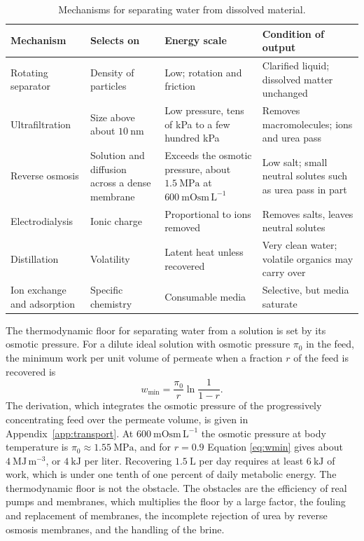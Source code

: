 \documentclass[11pt,openany]{book}
\theoremstyle{definition}
\theoremstyle{remark}
\begin{document}
\begin{table}[ht]
\centering
\caption{Mechanisms for separating water from dissolved material.}
\label{tab:sep}
\small
\begin{tabular}{@{}p{2.6cm}p{3.1cm}p{3.6cm}p{4.3cm}@{}}
\toprule
Mechanism & Selects on & Energy scale & Condition of output \\
\midrule
Rotating separator & Density of particles & Low; rotation and friction & Clarified liquid; dissolved matter unchanged \\
Ultrafiltration & Size above about $10\ \mathrm{nm}$ & Low pressure, tens of kPa to a few hundred kPa & Removes macromolecules; ions and urea pass \\
Reverse osmosis & Solution and diffusion across a dense membrane & Exceeds the osmotic pressure, about $1.5\ \mathrm{MPa}$ at $600\ \mathrm{mOsm\,L^{-1}}$ & Low salt; small neutral solutes such as urea pass in part \\
Electrodialysis & Ionic charge & Proportional to ions removed & Removes salts, leaves neutral solutes \\
Distillation & Volatility & Latent heat unless recovered & Very clean water; volatile organics may carry over \\
Ion exchange and adsorption & Specific chemistry & Consumable media & Selective, but media saturate \\
\bottomrule
\end{tabular}
\end{table}

The thermodynamic floor for separating water from a solution is set by its osmotic pressure. For a dilute ideal solution with osmotic pressure $\pi_0$ in the feed, the minimum work per unit volume of permeate when a fraction $r$ of the feed is recovered is
\begin{equation}
w_{\min}=\frac{\pi_0}{r}\ln\frac{1}{1-r}.
\label{eq:wmin}
\end{equation}
The derivation, which integrates the osmotic pressure of the progressively concentrating feed over the permeate volume, is given in Appendix~\ref{app:transport}. At $600\ \mathrm{mOsm\,L^{-1}}$ the osmotic pressure at body temperature is $\pi_0\approx1.55\ \mathrm{MPa}$, and for $r=0.9$ Equation \eqref{eq:wmin} gives about $4\ \mathrm{MJ\,m^{-3}}$, or $4\ \mathrm{kJ}$ per liter. Recovering $1.5\ \mathrm{L}$ per day requires at least $6\ \mathrm{kJ}$ of work, which is under one tenth of one percent of daily metabolic energy. The thermodynamic floor is not the obstacle. The obstacles are the efficiency of real pumps and membranes, which multiplies the floor by a large factor, the fouling and replacement of membranes, the incomplete rejection of urea by reverse osmosis membranes, and the handling of the brine.
\end{document}
